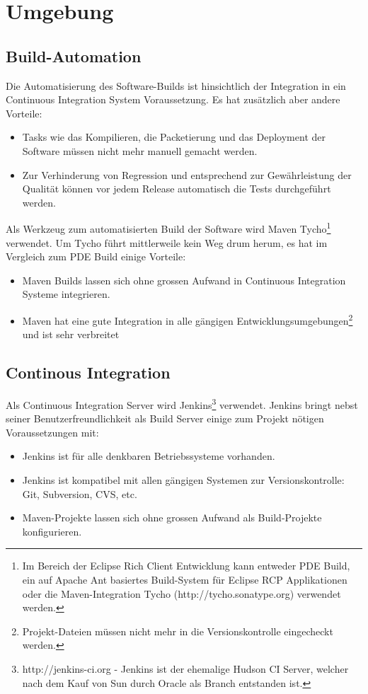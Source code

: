 \section{Umgebung}
\subsection{Build-Automation}
Die Automatisierung des Software-Builds ist hinsichtlich der Integration in ein Continuous Integration System Voraussetzung. Es hat zusätzlich aber andere Vorteile:
\begin{itemize}
	\item Tasks wie das Kompilieren, die Packetierung und das Deployment der Software müssen nicht mehr manuell gemacht werden.
	\item Zur Verhinderung von Regression und entsprechend zur Gewährleistung der Qualität können vor jedem Release automatisch die Tests durchgeführt werden.
\end{itemize}


Als Werkzeug zum automatisierten Build der Software wird Maven Tycho\footnote{Im Bereich der Eclipse Rich Client Entwicklung kann entweder PDE Build, ein auf Apache Ant basiertes Build-System für Eclipse RCP Applikationen\cite{vogelZapfPdeBuild} oder die Maven-Integration Tycho (http://tycho.sonatype.org) verwendet werden.} verwendet. Um Tycho führt mittlerweile kein Weg drum herum, es hat im Vergleich zum PDE Build einige Vorteile:
\begin{itemize}
	\item Maven Builds lassen sich ohne grossen Aufwand in Continuous Integration Systeme integrieren.
	\item Maven hat eine gute Integration in alle gängigen Entwicklungsumgebungen\footnote{Projekt-Dateien müssen nicht mehr in die Versionskontrolle eingecheckt werden.} und ist sehr verbreitet
\end{itemize}

\subsection{Continous Integration}
Als Continuous Integration Server wird Jenkins\footnote{http://jenkins-ci.org - Jenkins ist der ehemalige Hudson CI Server, welcher nach dem Kauf von Sun durch Oracle als Branch entstanden ist.} verwendet. Jenkins bringt nebst seiner Benutzerfreundlichkeit als Build Server einige zum Projekt nötigen Voraussetzungen mit:
\begin{itemize}
	\item Jenkins ist für alle denkbaren Betriebssysteme vorhanden.
	\item Jenkins ist kompatibel mit allen gängigen Systemen zur Versionskontrolle: Git, Subversion, CVS, etc.
	\item Maven-Projekte lassen sich ohne grossen Aufwand als Build-Projekte konfigurieren.
\end{itemize}

